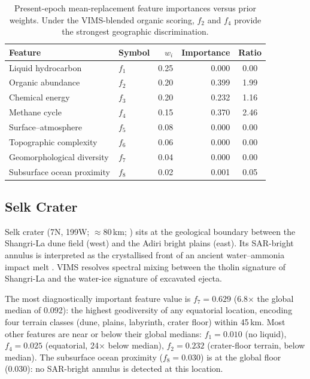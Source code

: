 \begin{table}[H]
\centering
\begin{tabular}{llrrc}
\toprule
\textbf{Feature} & \textbf{Symbol} & \textbf{$w_i$} & \textbf{Importance} & \textbf{Ratio} \\
\midrule
Liquid hydrocarbon           & $f_1$ & 0.25 & 0.000 & 0.00 \\
Organic abundance            & $f_2$ & 0.20 & 0.399 & 1.99 \\
Chemical energy              & $f_3$ & 0.20 & 0.232 & 1.16 \\
Methane cycle                & $f_4$ & 0.15 & 0.370 & 2.46 \\
Surface--atmosphere          & $f_5$ & 0.08 & 0.000 & 0.00 \\
Topographic complexity       & $f_6$ & 0.06 & 0.000 & 0.00 \\
Geomorphological diversity   & $f_7$ & 0.04 & 0.000 & 0.00 \\
Subsurface ocean proximity   & $f_8$ & 0.02 & 0.001 & 0.05 \\
\bottomrule
\end{tabular}
\caption{Present-epoch mean-replacement feature importances versus prior weights.
  Under the VIMS-blended organic scoring, $f_2$ and $f_4$ provide the strongest
  geographic discrimination.}
\label{tab:importances}
\end{table}

\subsection{Selk Crater}
\label{sec:selk}
\label{sec:selk_context}

Selk crater (7\textdegree{}N, 199\textdegree{}W; $\approx$80\,km; \citealt{Hedgepeth2020}) sits at the geological boundary between the Shangri-La dune field (west) and the Adiri bright plains (east).  Its SAR-bright annulus is interpreted as the crystallised front of an ancient water--ammonia impact melt \citep{Wood2010}.  VIMS resolves spectral mixing between the tholin signature of Shangri-La and the water-ice signature of excavated ejecta.

The most diagnostically important feature value is $f_7 = 0.629$ (6.8$\times$ the global median of 0.092): the highest geodiversity of any equatorial location, encoding four terrain classes (dune, plains, labyrinth, crater floor) within 45\,km.  Most other features are near or below their global medians: $f_1 = 0.010$ (no liquid), $f_4 = 0.025$ (equatorial, 24$\times$ below median), $f_2 = 0.232$ (crater-floor terrain, below median).  The subsurface ocean proximity ($f_8 = 0.030$) is at the global floor (0.030): no SAR-bright annulus is detected at this location.

